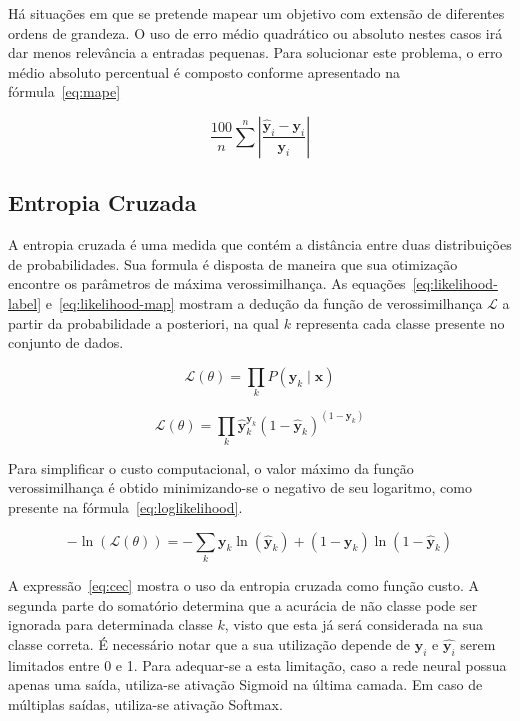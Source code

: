 Há situações em que se pretende mapear um objetivo com extensão de diferentes ordens de grandeza. O uso de erro médio quadrático ou absoluto nestes casos irá dar menos relevância a entradas pequenas. Para solucionar este problema, o erro médio absoluto percentual é composto conforme apresentado na fórmula~\ref{eq:mape}

\begin{equation} \label{eq:mape}
    \frac{100}{n}\sum^n \left|\frac{\hat{\mathbf{y}}_i - \mathbf{y}_i}{\mathbf{y}_i}\right|
\end{equation}

\subsection{Entropia Cruzada}

A entropia cruzada é uma medida que contém a distância entre duas distribuições de probabilidades. Sua formula é disposta de maneira que sua otimização encontre os parâmetros de máxima verossimilhança. As equações~\ref{eq:likelihood-label} e~\ref{eq:likelihood-map} mostram a dedução da função de verossimilhança $\mathcal{L}$ a partir da probabilidade a posteriori, na qual $k$ representa cada classe presente no conjunto de dados.

\begin{equation} \label{eq:likelihood-label}
    \mathcal{L}(\theta) = \prod_k P(\mathbf{y}_k \mid \mathbf{x})
\end{equation}

\begin{equation} \label{eq:likelihood-map}
    \mathcal{L}(\theta) = \prod_k \mathbf{\hat{y}}_k^{\mathbf{y}_k} (1 - \mathbf{\hat{y}}_k)^{(1 - \mathbf{y}_k)}
\end{equation}

Para simplificar o custo computacional, o valor máximo da função verossimilhança é obtido minimizando-se o negativo de seu logaritmo, como presente na fórmula~\ref{eq:loglikelihood}.

\begin{equation} \label{eq:loglikelihood}
        -\ln(\mathcal{L}(\theta)) = -\sum_k \mathbf{y}_k \ln(\mathbf{\hat{y}}_k) + (1 - \mathbf{y}_k) \ln(1 - \mathbf{\hat{y}}_k)
\end{equation}

A expressão~\ref{eq:cec} mostra o uso da entropia cruzada como função custo. A segunda parte do somatório determina que a acurácia de não classe pode ser ignorada para determinada classe $k$, visto que esta já será considerada na sua classe correta. É necessário notar que a sua utilização depende de $\mathbf{y}_i$ e $\hat{\mathbf{y}_i}$ serem limitados entre 0 e 1. Para adequar-se a esta limitação, caso a rede neural possua apenas uma saída, utiliza-se ativação Sigmoid na última camada. Em caso de múltiplas saídas, utiliza-se ativação Softmax.

